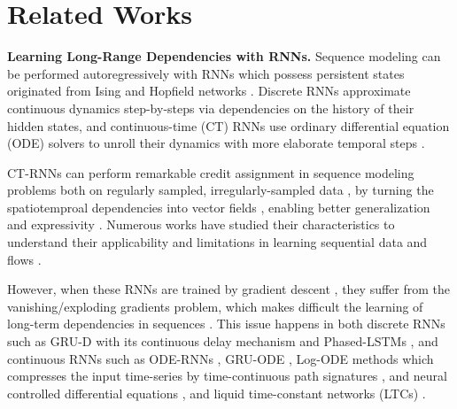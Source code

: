 \documentclass{MITcsail}
\begin{document}
\section{Related Works}

\textbf{Learning Long-Range Dependencies with RNNs.} 
Sequence modeling can be performed autoregressively with RNNs which possess persistent states \citep{little1974existence} originated from Ising \citep{brush1967history} and Hopfield networks \citep{hopfield1982neural,ramsauer2020hopfield}. Discrete RNNs approximate continuous dynamics step-by-steps via dependencies on the history of their hidden states,  and continuous-time (CT) RNNs use ordinary differential equation (ODE) solvers to unroll their dynamics with more elaborate temporal steps \citep{funahashi1993approximation}. 

CT-RNNs can perform remarkable credit assignment in sequence modeling problems both on regularly sampled, irregularly-sampled data \citep{pearson2003imbalanced,li2016scalable,belletti2016scalable,roy2020robust,foster1996wavelets,amigo2012transcripts,kowal2019functional}, by turning the spatiotemproal dependencies into vector fields \citep{chen2018neural}, enabling better generalization and expressivity \citep{massaroli2020dissecting,hasani2021liquid}. Numerous works have studied their characteristics to understand their applicability and limitations in learning sequential data and flows \citep{lechner2019designing,dupont2019augmented,durkan2019neural,jia2019neural,grunbacher2021verification,hanshu2020robustness,holl2020learning,quaglino2020snode,kidger2020neural,hasani2020natural,liebenwein2021sparse,gruenbacher2022gotube}.

However, when these RNNs are trained by gradient descent \citep{rumelhart1986learning,allen2019can,sherstinsky2020fundamentals}, they suffer from the vanishing/exploding gradients problem, which makes difficult the learning of long-term dependencies in sequences \citep{hochreiter1991untersuchungen,bengio1994learning}. This issue happens in both discrete RNNs such as GRU-D with its continuous delay mechanism \citep{che2018recurrent} and Phased-LSTMs \citep{neil2016phased}, and continuous RNNs such as ODE-RNNs \citep{rubanova2019latent}, GRU-ODE \citep{de2019gru}, Log-ODE methods \citep{morrill2020neural} which compresses the input time-series by time-continuous path signatures \citep{friz2010multidimensional}, and neural controlled differential equations  \citep{kidger2020neural}, and liquid time-constant networks (LTCs) \citep{hasani2021liquid}. 
\end{document}
